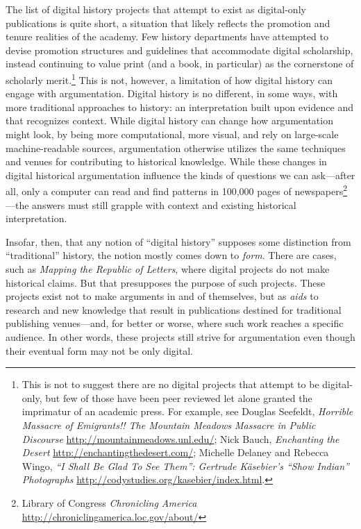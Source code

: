 \documentclass[11pt,]{article}
\begin{document}
The list of digital history projects that attempt to exist as
digital-only publications is quite short, a situation that likely
reflects the promotion and tenure realities of the academy. Few history
departments have attempted to devise promotion structures and guidelines
that accommodate digital scholarship, instead continuing to value print
(and a book, in particular) as the cornerstone of scholarly
merit.\footnote{This is not to suggest there are no digital projects
  that attempt to be digital-only, but few of those have been peer
  reviewed let alone granted the imprimatur of an academic press. For
  example, see Douglas Seefeldt, \emph{Horrible Massacre of Emigrants!!
  The Mountain Meadows Massacre in Public Discourse}
  \url{http://mountainmeadows.unl.edu/}; Nick Bauch, \emph{Enchanting
  the Desert} \url{http://enchantingthedesert.com/}; Michelle Delaney
  and Rebecca Wingo, \emph{``I Shall Be Glad To See Them'': Gertrude
  Käsebier's ``Show Indian'' Photographs}
  \url{http://codystudies.org/kasebier/index.html}.} This is not,
however, a limitation of how digital history can engage with
argumentation. Digital history is no different, in some ways, with more
traditional approaches to history: an interpretation built upon evidence
and that recognizes context. While digital history can change how
argumentation might look, by being more computational, more visual, and
rely on large-scale machine-readable sources, argumentation otherwise
utilizes the same techniques and venues for contributing to historical
knowledge. While these changes in digital historical argumentation
influence the kinds of questions we can ask---after all, only a computer
can read and find patterns in 100,000 pages of newspapers\footnote{Library
  of Congress \emph{Chronicling America}
  \url{http://chroniclingamerica.loc.gov/about/}}---the answers must
still grapple with context and existing historical interpretation.

Insofar, then, that any notion of ``digital history'' supposes some
distinction from ``traditional'' history, the notion mostly comes down
to \emph{form}. There are cases, such as \emph{Mapping the Republic of
Letters}, where digital projects do not make historical claims. But that
presupposes the purpose of such projects. These projects exist not to
make arguments in and of themselves, but as \emph{aids} to research and
new knowledge that result in publications destined for traditional
publishing venues---and, for better or worse, where such work reaches a
specific audience. In other words, these projects still strive for
argumentation even though their eventual form may not be only digital.
\end{document}
